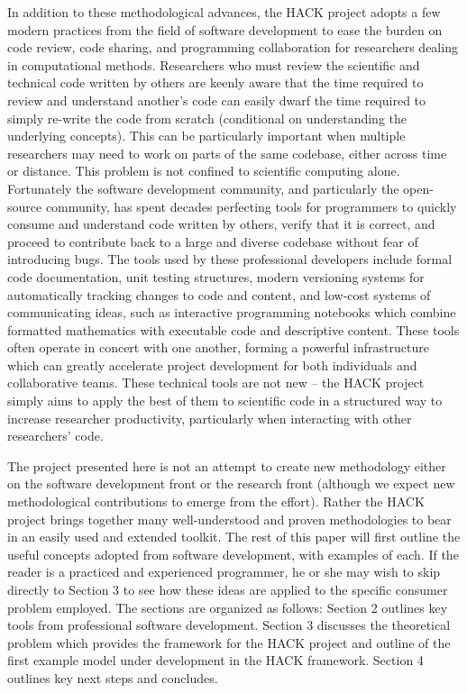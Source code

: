 \documentclass[]{article}
\begin{document}
In addition to these methodological advances, the HACK project adopts a
few modern practices from the field of software development to ease the
burden on code review, code sharing, and programming collaboration for
researchers dealing in computational methods. Researchers who must
review the scientific and technical code written by others are keenly
aware that the time required to review and understand another's code can
easily dwarf the time required to simply re-write the code from scratch
(conditional on understanding the underlying concepts). This can be
particularly important when multiple researchers may need to work on
parts of the same codebase, either across time or distance. This problem
is not confined to scientific computing alone. Fortunately the software
development community, and particularly the open-source community, has
spent decades perfecting tools for programmers to quickly consume and
understand code written by others, verify that it is correct, and
proceed to contribute back to a large and diverse codebase without fear
of introducing bugs. The tools used by these professional developers
include formal code documentation, unit testing structures, modern
versioning systems for automatically tracking changes to code and
content, and low-cost systems of communicating ideas, such as
interactive programming notebooks which combine formatted mathematics
with executable code and descriptive content. These tools often operate
in concert with one another, forming a powerful infrastructure which can
greatly accelerate project development for both individuals and
collaborative teams. These technical tools are not new -- the HACK
project simply aims to apply the best of them to scientific code in a
structured way to increase researcher productivity, particularly when
interacting with other researchers' code.

\href{Insert\%20literature\%20review\%20of\%20software\%20development\%20practices\%20as\%20well\%20as\%20the\%20baseline\%20models\%20employed.}{}

The project presented here is not an attempt to create new methodology
either on the software development front or the research front (although
we expect new methodological contributions to emerge from the effort).
Rather the HACK project brings together many well-understood and proven
methodologies to bear in an easily used and extended toolkit. The rest
of this paper will first outline the useful concepts adopted from
software development, with examples of each. If the reader is a
practiced and experienced programmer, he or she may wish to skip
directly to Section 3 to see how these ideas are applied to the specific
consumer problem employed. The sections are organized as follows:
Section 2 outlines key tools from professional software development.
Section 3 discusses the theoretical problem which provides the framework
for the HACK project and outline of the first example model under
development in the HACK framework. Section 4 outlines key next steps and
concludes.
\end{document}
